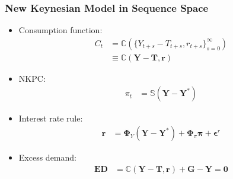 \documentclass[english,xcolor=svgnames]{beamer}
\begin{document}
\begin{frame}
    \frametitle{New Keynesian Model in Sequence Space}
    \begin{itemize}
        \item Consumption function:
        \begin{align*}
            C_t &= \mathbb{C}(\{Y_{t+s}-T_{t+s},r_{t+s}\}_{s=0}^{\infty}) \\
            &\equiv \mathbb{C}(\bm{Y}-\bm{T},\bm{r})
        \end{align*}
        \item NKPC:
        \begin{align*}
            \pi_t &= \mathbb{S}(\bm{Y} - \bm{Y}^*) 
        \end{align*}
        \item Interest rate rule:
        \begin{align*}
            \bm{r} &= \bm{\Phi}_Y (\bm{Y} - \bm{Y}^*) +  \bm{\Phi}_\pi \bm{\pi} + \bm{\epsilon}^r 
        \end{align*}
        \item Excess demand:
        \begin{align*}
            \bm{ED} &= \pmb{\mathbb{C}}(\bm{Y}-\bm{T},\bm{r}) + \bm{G} - \bm{Y} =\bm{0}
        \end{align*}
    \end{itemize}
\end{frame}
\end{document}
